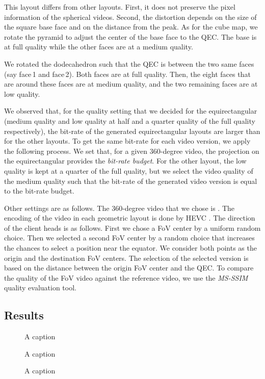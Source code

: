 This layout differs from other layouts. First, it does not preserve
the pixel information of the spherical videos. Second, the distortion depends on the size of the square
base face and on the distance from the peak. As for the cube map, we rotate the pyramid to adjust
the center of the base face to the \ac{QEC}. The base is at full quality while the other faces are
at a medium quality. 

We rotated the dodecahedron such that the \ac{QEC} is between
the two same faces (say face\,1 and face\,2). Both faces are at full quality. Then, the eight
faces that are around
these faces are at medium quality, and the two remaining faces are at low quality.

We observed that, for the quality setting that we decided for the equirectangular (medium quality and
low quality at half and a quarter quality of the full quality respectively), the bit-rate of the
generated equirectangular layouts are larger than for the other layouts. To get the
same bit-rate for each video version, we apply the following process. We set that, for a given
360-degree video, the projection on the equirectangular provides the \emph{bit-rate budget}. For the
other layout, the low quality is kept at a quarter of the full quality, but we select the video quality of the medium quality such that the bit-rate of the generated video version is equal to the
bit-rate budget.

Other settings are as follows.
The 360-degree video that we chose is . The encoding of the video in each
geometric layout is done by HEVC . The direction of the client heads is as follows.
First we chose a \ac{FoV} center by a uniform random choice. Then we selected a second \ac{FoV} center
by a random choice that increases the chances to select a position near the equator. We consider
both points as the origin and the destination \ac{FoV} centers. The selection of the selected version
is based on the distance between the origin \ac{FoV} center and the \ac{QEC}. To compare the
quality of the \ac{FoV} video against the reference video, we use the \emph{MS-SSIM} quality
evaluation tool.


\subsection{Results}
\label{subsec:results}

\begin{figure}
    
    \caption{A caption}
    \label{fig:box_plot}
\end{figure}

\begin{figure}
    
    \caption{A caption}
    \label{fig:dist_quality}
\end{figure}

\begin{figure}
    
    \caption{A caption}
    \label{fig:dist_quality_psnr}
\end{figure}
